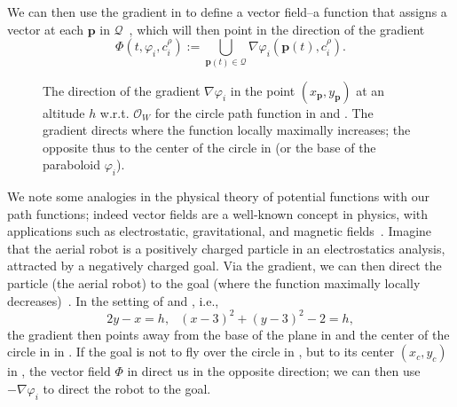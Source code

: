 We can then use the gradient in  to define a vector field--a function that assigns a vector at each $\mathbf{p}$ in $\mathcal{Q}$~\citep{lavalle2006planning}, which will then point in the direction of the gradient
\begin{equation}\label{eq:vec-field-def}
  \varPhi(t,\varphi_i,c_i^\rho):=\bigcup\limits_{\mathbf{p}(t)\in\mathcal{Q}}{\nabla\varphi_i(\mathbf{p}(t),c_i^\rho)}.
\end{equation}

\begin{figure}[ht!]
  \centering
  \selectfont
  
  \caption[The direction of the gradient on a circle path function]{The direction of the gradient $\nabla\varphi_i$ in the point $(x_\mathbf{p},y_{\mathbf{p}})$ at an altitude $h$ w.r.t. $\mathcal{O}_W$ for the circle path function in  and . The gradient directs where the function locally maximally increases; the opposite thus to the center of the circle in  (or the base of the paraboloid $\varphi_i$).}
  \label{fig:grad}
\end{figure}
We note some analogies in the physical theory of potential functions with our path functions; indeed vector fields are a well-known concept in physics, with applications such as electrostatic, gravitational, and magnetic fields~\citep{feynman2015feynman}. Imagine that the aerial robot is a positively charged particle in an electrostatics analysis, attracted by a negatively charged goal. Via the gradient, we can then direct the particle (the aerial robot) to the goal (where the function maximally locally decreases)~\citep{choset2005principles}. In the setting of  and , i.e., 
\begin{equation}\label{eq:two-paths}
  2y-x=h,\,\,\,\ (x-3)^2+(y-3)^2-2=h,
\end{equation}
the gradient then points away from the base of the plane in  and the center of the circle in  in . If the goal is not to fly over the circle in , but to its center $(x_c,y_c)$ in , the vector field $\varPhi$ in  direct us in the opposite direction; we can then use $-\nabla\varphi_i$ to direct the robot to the goal.

